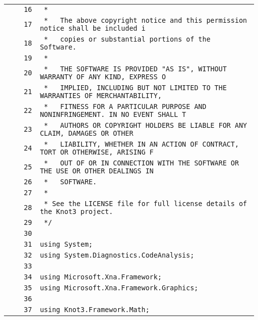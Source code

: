 \documentclass[a4paper,10pt]{article}
\begin{document}
\begin{longtable}[l]{lrrl}
\cellcolor{gray} &  & \verb~16~ & \verb~ *~\\
\cellcolor{gray} &  & \verb~17~ & \verb~ *   The above copyright notice and this permission notice shall be included i~\\
\cellcolor{gray} &  & \verb~18~ & \verb~ *   copies or substantial portions of the Software.~\\
\cellcolor{gray} &  & \verb~19~ & \verb~ *~\\
\cellcolor{gray} &  & \verb~20~ & \verb~ *   THE SOFTWARE IS PROVIDED "AS IS", WITHOUT WARRANTY OF ANY KIND, EXPRESS O~\\
\cellcolor{gray} &  & \verb~21~ & \verb~ *   IMPLIED, INCLUDING BUT NOT LIMITED TO THE WARRANTIES OF MERCHANTABILITY,~\\
\cellcolor{gray} &  & \verb~22~ & \verb~ *   FITNESS FOR A PARTICULAR PURPOSE AND NONINFRINGEMENT. IN NO EVENT SHALL T~\\
\cellcolor{gray} &  & \verb~23~ & \verb~ *   AUTHORS OR COPYRIGHT HOLDERS BE LIABLE FOR ANY CLAIM, DAMAGES OR OTHER~\\
\cellcolor{gray} &  & \verb~24~ & \verb~ *   LIABILITY, WHETHER IN AN ACTION OF CONTRACT, TORT OR OTHERWISE, ARISING F~\\
\cellcolor{gray} &  & \verb~25~ & \verb~ *   OUT OF OR IN CONNECTION WITH THE SOFTWARE OR THE USE OR OTHER DEALINGS IN~\\
\cellcolor{gray} &  & \verb~26~ & \verb~ *   SOFTWARE.~\\
\cellcolor{gray} &  & \verb~27~ & \verb~ *~\\
\cellcolor{gray} &  & \verb~28~ & \verb~ * See the LICENSE file for full license details of the Knot3 project.~\\
\cellcolor{gray} &  & \verb~29~ & \verb~ */~\\
\cellcolor{gray} &  & \verb~30~ & \verb~~\\
\cellcolor{gray} &  & \verb~31~ & \verb~using System;~\\
\cellcolor{gray} &  & \verb~32~ & \verb~using System.Diagnostics.CodeAnalysis;~\\
\cellcolor{gray} &  & \verb~33~ & \verb~~\\
\cellcolor{gray} &  & \verb~34~ & \verb~using Microsoft.Xna.Framework;~\\
\cellcolor{gray} &  & \verb~35~ & \verb~using Microsoft.Xna.Framework.Graphics;~\\
\cellcolor{gray} &  & \verb~36~ & \verb~~\\
\cellcolor{gray} &  & \verb~37~ & \verb~using Knot3.Framework.Math;~\\

\end{longtable}
\end{document}
